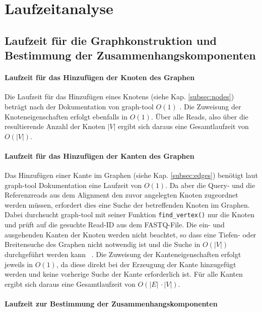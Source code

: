 \chapter{Laufzeitanalyse} \label{sec:}

\section{Laufzeit für die Graphkonstruktion und Bestimmung der Zusammenhangskomponenten} \label{sec:}
\subsubsection{Laufzeit für das Hinzufügen der Knoten des Graphen} \label{subsec:}
Die Laufzeit für das Hinzufügen eines Knotens (siehe Kap. \ref{subsec:nodes}) beträgt nach der Dokumentation von graph-tool  $ O(1) $ \cite{docs_graph_tool}. Die Zuweisung der Knoteneigenschaften erfolgt ebenfalls in $ O(1) $. Über alle Reads, also über die resultierende Anzahl der Knoten $ |V| $ ergibt sich daraus eine Gesamtlaufzeit von $ O(|V|) $.\\

\subsubsection{Laufzeit für das Hinzufügen der Kanten des Graphen} \label{subsec:}

Das Hinzufügen einer Kante im Graphen (siehe Kap. \ref{subsec:edges}) benötigt laut graph-tool Dokumentation \cite{docs_graph_tool} eine Laufzeit von $ O(1) $. Da aber die Query- und die Referenzreads aus dem Alignment den zuvor angelegten Knoten zugeordnet werden müssen, erfordert dies eine Suche der betreffenden Knoten im Graphen. Dabei durchsucht graph-tool mit seiner Funktion \lstinline|find_vertex()| nur die Knoten und prüft auf die gesuchte Read-ID aus dem FASTQ-File. Die ein- und ausgehenden Kanten der Knoten werden nicht beachtet, so dass eine Tiefen- oder Breitensuche des Graphen nicht notwendig ist und die Suche in $ O(|V|) $ durchgeführt werden kann ~\cite{graph_tool_coplexity_find_vertex}. Die Zuweisung der Kanteneigenschaften erfolgt jeweils in $ O(1) $, da diese direkt bei der Erzeugung der Kante hinzugefügt werden und keine vorherige Suche der Kante erforderlich ist. Für alle Kanten ergibt sich daraus eine Gesamtlaufzeit von $ O(|E|\, \cdotp |V|) $. \\


\subsubsection{Laufzeit zur Bestimmung der Zusammenhangskomponenten} \label{subsec:}

